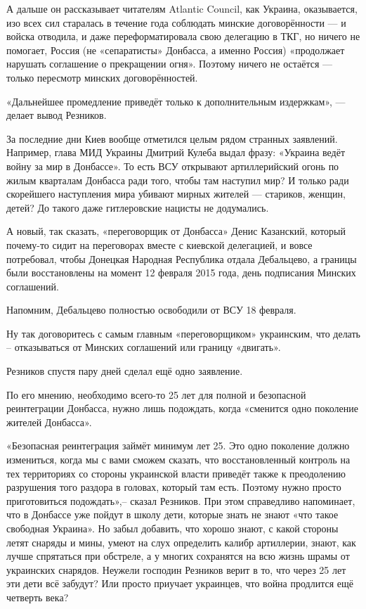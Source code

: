 \documentclass[a4paper,11pt]{extreport}
\begin{document}
А дальше он рассказывает читателям Atlantic Council, как Украина, оказывается,
изо всех сил старалась в течение года соблюдать минские договорённости --- и
войска отводила, и даже переформатировала свою делегацию в ТКГ, но ничего не
помогает, Россия (не «сепаратисты» Донбасса, а именно Россия) «продолжает
нарушать соглашение о прекращении огня». Поэтому ничего не остаётся --- только
пересмотр минских договорённостей.

«Дальнейшее промедление приведёт только к дополнительным издержкам», --- делает
вывод Резников.

За последние дни Киев вообще отметился целым рядом странных заявлений.
Например, глава МИД Украины Дмитрий Кулеба выдал фразу: «Украина ведёт войну за
мир в Донбассе». То есть ВСУ открывают артиллерийский огонь по жилым кварталам
Донбасса ради того, чтобы там наступил мир? И только ради скорейшего
наступления мира убивают мирных жителей --- стариков, женщин, детей? До такого
даже гитлеровские нацисты не додумались.

А новый, так сказать, «переговорщик от Донбасса» Денис Казанский, который
почему-то сидит на переговорах вместе с киевской делегацией, и вовсе
потребовал, чтобы Донецкая Народная Республика отдала Дебальцево, а границы
были восстановлены на момент 12 февраля 2015 года, день подписания Минских
соглашений.

Напомним, Дебальцево полностью освободили от ВСУ 18 февраля.

Ну так договоритесь с самым главным «переговорщиком» украинским, что делать –
отказываться от Минских соглашений или границу «двигать».

Резников спустя пару дней сделал ещё одно заявление.

По его мнению, необходимо всего-то 25 лет для полной и безопасной реинтеграции
Донбасса, нужно лишь подождать, когда «сменится одно поколение жителей
Донбасса».

«Безопасная реинтеграция займёт минимум лет 25. Это одно поколение должно
измениться, когда мы с вами сможем сказать, что восстановленный контроль на тех
территориях со стороны украинской власти приведёт также к преодолению
разрушения того раздора в головах, который там есть. Поэтому нужно просто
приготовиться подождать»,– сказал Резников. При этом справедливо напоминает,
что в Донбассе уже пойдут в школу дети, которые знать не знают «что такое
свободная Украина». Но забыл добавить, что хорошо знают, с какой стороны летят
снаряды и мины, умеют на слух определить калибр артиллерии, знают, как лучше
спрятаться при обстреле, а у многих сохранятся на всю жизнь шрамы от украинских
снарядов. Неужели господин Резников верит в то, что через 25 лет эти дети всё
забудут? Или просто приучает украинцев, что война продлится ещё четверть века?
\end{document}
